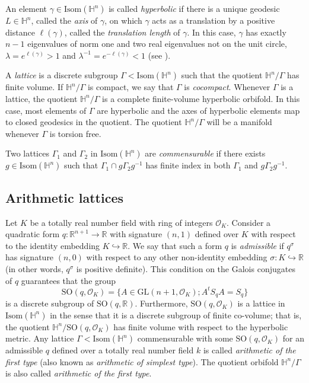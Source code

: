 \documentclass[12pt]{amsart}
\newcommand{\SO}{\mathrm{SO}}
\renewcommand{\H}{\mathbb{H}}
\newcommand{\R}{\mathbb{R}}
\newcommand{\GL}{\mathrm{GL}}
\theoremstyle{plain}
\begin{document}
An element $\gamma\in \mathrm{Isom}(\H^n)$ is called \emph{hyperbolic} if there is a unique geodesic $L\in\H^n$, called the \emph{axis} of $\gamma$, on which $\gamma$ acts as a translation by a positive distance $\ell(\gamma)$, called the \emph{translation length} of $\gamma$. In this case, $\gamma$ has exactly $n-1$ eigenvalues of norm one and two real eigenvalues not on the unit circle, $\lambda=e^{\ell(\gamma)}>1$ and $\lambda^{-1}=e^{-\ell(\gamma)}<1$ (see \cite{ChenGreenberg}). 

A \emph{lattice} is a discrete subgroup $\Gamma<\mathrm{Isom}(\H^n)$ such that the quotient $\H^n/\Gamma$ has finite volume. If $\H^n/\Gamma$ is compact, we say that $\Gamma$ is \textit{cocompact}. Whenever $\Gamma$ is a lattice, the quotient $\H^n/\Gamma$ is a complete finite-volume hyperbolic orbifold. In this case, most elements of $\Gamma$ are hyperbolic and the axes of hyperbolic elements map to closed geodesics in the quotient. The quotient $\H^n/\Gamma$ will be a manifold whenever $\Gamma$ is torsion free. 

Two lattices $\Gamma_1$ and $\Gamma_2$ in $\mathrm{Isom}(\H^n)$ are \emph{commensurable} if there exists $g\in\mathrm{Isom}(\H^n)$ such that $\Gamma_1\cap g\Gamma_2g^{-1}$ has finite index in both $\Gamma_1$ and $g\Gamma_2g^{-1}$. 

\subsection{Arithmetic lattices}\label{ss:arithmetic lattices}
Let $K$ be a totally real number field with ring of integers $\mathcal{O}_K$. Consider a quadratic form $q:\R^{n+1} \rightarrow \R$ with signature $(n,1)$ defined over $K$ with respect to the identity embedding $K\hookrightarrow \R$. We say that such a form $q$ is \emph{admissible} if $q^\sigma$ has signature $(n,0)$ with respect to any other non-identity embedding $\sigma:K\hookrightarrow \R$ (in other words, $q^\sigma$ is positive definite). This condition on the Galois conjugates of $q$ guarantees that the group
\[ \SO(q,\mathcal{O}_K) = \{ A \in \GL(n+1,\mathcal{O}_K); A^tS_qA=S_q\}\]
is a discrete subgroup of $\SO(q,\R)$. Furthermore, $\SO(q,\mathcal{O}_K)$ is a lattice in $\mathrm{Isom}(\H^n)$ in the sense that it is a discrete subgroup of finite co-volume; that is, the quotient $\H^n/\SO(q,\mathcal{O}_K)$ has finite volume with respect to the hyperbolic metric.
Any lattice $\Gamma<\mathrm{Isom}(\H^n)$ commensurable with some $\SO(q,\mathcal{O}_K)$ for an admissible $q$ defined over a totally real number field $k$ is called \emph{arithmetic of the first type} (also known as \emph{arithmetic of simplest type}). The quotient orbifold $\H^n/\Gamma$ is also called \emph{arithmetic of the first type}.
\end{document}
